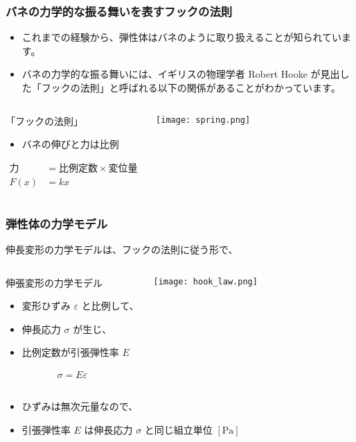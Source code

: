 \documentclass[12pt, dvipdfmx]{beamer}
\begin{document}
\begin{frame}
	\frametitle{バネの力学的な振る舞いを表すフックの法則}
		\begin{screen}
			\begin{itemize}
				\item これまでの経験から、弾性体はバネのように取り扱えることが知られています。
				\item バネの力学的な振る舞いには、イギリスの物理学者 Robert Hooke が見出した「フックの法則」と呼ばれる以下の関係があることがわかっています。
			\end{itemize}
		\end{screen}
		\begin{columns}[c, onlytextwidth]
				\begin{block}{「フックの法則」}
					\begin{itemize}
						\item バネの伸びと力は比例
					\end{itemize}
					\vspace{-1mm}
					\begin{align*}
						\text{力} &= \text{比例定数} \times \text{変位量} \\
						F(x) &= k x
					\end{align*}
				\end{block}
			\column{.48\linewidth}
				\begin{center}
					\texttt{[image: spring.png]}
				\end{center}
		\end{columns}
\end{frame}

\begin{frame}
	\frametitle{弾性体の力学モデル}
		伸長変形の力学モデルは、フックの法則に従う形で、
	\begin{columns}[c, onlytextwidth]
		\column{.52\linewidth}
			\begin{block}{伸張変形の力学モデル}
				\begin{itemize}
					\item 変形ひずみ $\varepsilon$ と比例して、
					\item 伸長応力 $\sigma$ が生じ、
					\item 比例定数が引張弾性率 $E$
				\end{itemize}
				\begin{align*}
					\sigma = E \varepsilon 
				\end{align*}
			\end{block}
		\column{.46\linewidth}
		\begin{center}
			\texttt{[image: hook\_law.png]}
		\end{center}
	\end{columns}
	\begin{screen}
		\begin{itemize}
			\item ひずみは無次元量なので、
			\item 引張弾性率 $E$ は伸長応力 $\sigma$ と同じ組立単位 $[\mathrm{Pa}]$
		\end{itemize}
	\end{screen}
\end{frame}
\end{document}
